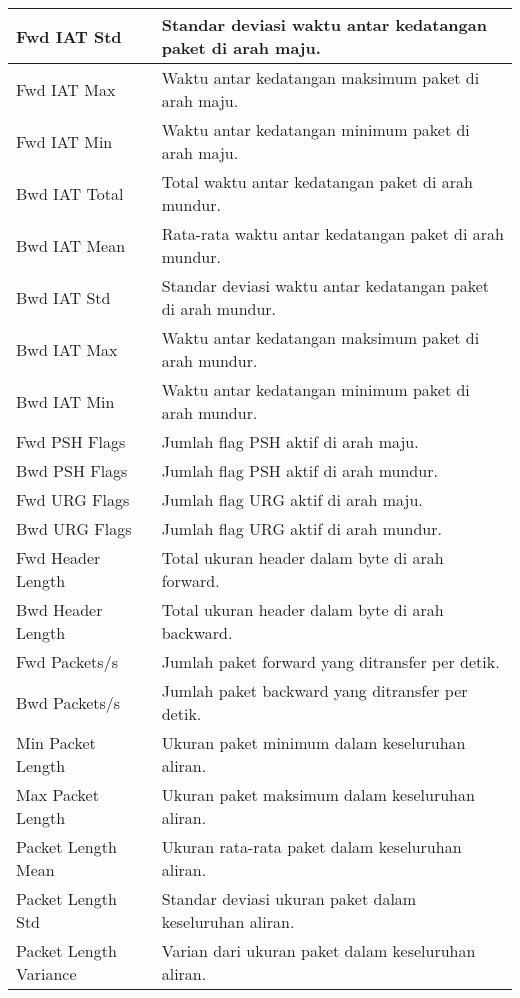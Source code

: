 \documentclass[a4paper,12pt]{report}
\begin{document}
\begin{table}[h!]
	\centering
	\begin{longtable}{|p{3cm} |p{10cm}|}
		\hline
		Fwd IAT Std & Standar deviasi waktu antar kedatangan paket di arah maju. \\
		\hline
		Fwd IAT Max & Waktu antar kedatangan maksimum paket di arah maju. \\
		\hline
		Fwd IAT Min & Waktu antar kedatangan minimum paket di arah maju. \\
		\hline
		Bwd IAT Total & Total waktu antar kedatangan paket di arah mundur. \\
		\hline
		Bwd IAT Mean & Rata-rata waktu antar kedatangan paket di arah mundur. \\
		\hline
		Bwd IAT Std & Standar deviasi waktu antar kedatangan paket di arah mundur. \\
		\hline
		Bwd IAT Max & Waktu antar kedatangan maksimum paket di arah mundur. \\
		\hline
		Bwd IAT Min & Waktu antar kedatangan minimum paket di arah mundur. \\
		\hline
		Fwd PSH Flags & Jumlah flag PSH aktif di arah maju. \\
		\hline
		Bwd PSH Flags & Jumlah flag PSH aktif di arah mundur. \\
		\hline
		Fwd URG Flags & Jumlah flag URG aktif di arah maju. \\
		\hline
		Bwd URG Flags & Jumlah flag URG aktif di arah mundur. \\
		\hline
		Fwd Header Length & Total ukuran header dalam byte di arah forward. \\
		\hline
		Bwd Header Length & Total ukuran header dalam byte di arah backward. \\
		\hline
		Fwd Packets/s & Jumlah paket forward yang ditransfer per detik. \\
		\hline
		Bwd Packets/s & Jumlah paket backward yang ditransfer per detik. \\
		\hline
		Min Packet Length & Ukuran paket minimum dalam keseluruhan aliran. \\
		\hline
		Max Packet Length & Ukuran paket maksimum dalam keseluruhan aliran. \\
		\hline
		Packet Length Mean & Ukuran rata-rata paket dalam keseluruhan aliran. \\
		\hline
		Packet Length Std & Standar deviasi ukuran paket dalam keseluruhan aliran. \\
		\hline
		Packet Length Variance & Varian dari ukuran paket dalam keseluruhan aliran. \\

\end{longtable}
\end{table}
\end{document}
